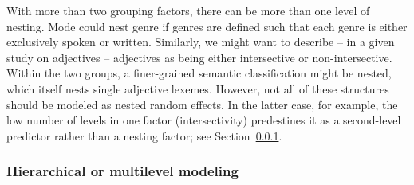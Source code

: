 \documentclass[a4paper,12pt]{article}
\begin{document}
With more than two grouping factors, there can be more than one level of nesting.
Mode could nest genre if genres are defined such that each genre is either exclusively spoken or written.
Similarly, we might want to describe -- in a given study on adjectives -- adjectives as being either intersective or non-intersective.
Within the two groups, a finer-grained semantic classification might be nested, which itself nests single adjective lexemes.
However, not all of these structures should be modeled as nested random effects.
In the latter case, for example, the low number of levels in one factor (intersectivity) predestines it as a second-level predictor rather than a nesting factor; see Section~\ref{sec:hierarchicalormultilevelmodels}.

\subsubsection{Hierarchical or multilevel modeling}
\label{sec:hierarchicalormultilevelmodels}
\end{document}
